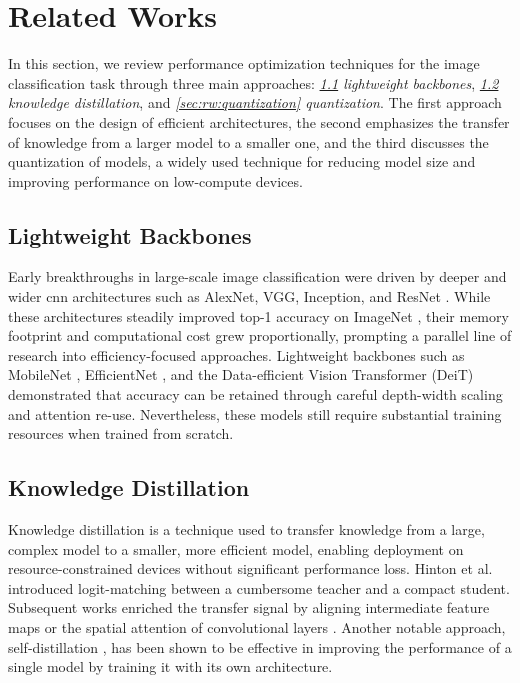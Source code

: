 \section{Related Works}

In this section, we review performance optimization techniques
for the image classification task through three main approaches:
\textit{\ref{sec:rw:lightweight_backbones} lightweight backbones},
\textit{\ref{sec:rw:knowledge_distillation} knowledge distillation},
and \textit{\ref{sec:rw:quantization} quantization}.
The first approach focuses on the design of efficient architectures,
the second emphasizes the transfer of knowledge from a larger model to a smaller one,
and the third discusses the quantization of models,
a widely used technique for reducing model size
and improving performance on low-compute devices.

\subsection{Lightweight Backbones}
\label{sec:rw:lightweight_backbones}

Early breakthroughs in large-scale image classification were driven by deeper and wider \gls*{cnn}
architectures such as AlexNet, VGG, Inception, and ResNet \cite{krizhevsky2012imagenet, simonyan2014very, szegedy2015going, he2016deep}.
While these architectures steadily improved top-1 accuracy on ImageNet \cite{deng2009imagenet},
their memory footprint and computational cost grew proportionally,
prompting a parallel line of research into efficiency-focused approaches.
Lightweight backbones such as MobileNet \cite{howard2017mobilenets,sandler2018mobilenetv2},
EfficientNet \cite{tan2019efficientnet}, and the Data-efficient Vision Transformer (DeiT) \cite{touvron2021training}
demonstrated that accuracy can be retained through careful depth-width scaling and attention re-use.
Nevertheless, these models still require substantial training resources when trained from scratch.

\subsection{Knowledge Distillation}
\label{sec:rw:knowledge_distillation}

Knowledge distillation is a technique used to transfer knowledge
from a large, complex model to a smaller, more efficient model,
enabling deployment on resource-constrained devices without significant performance loss.
Hinton et al. \cite{hinton2015distilling} introduced logit-matching between a cumbersome teacher and a compact student.
Subsequent works enriched the transfer signal by aligning intermediate feature maps \cite{romero2014fitnets}
or the spatial attention of convolutional layers \cite{zagoruyko2016paying}.
Another notable approach, self-distillation \cite{zhang2019your},
has been shown to be effective in improving the performance of a single model
by training it with its own architecture.

